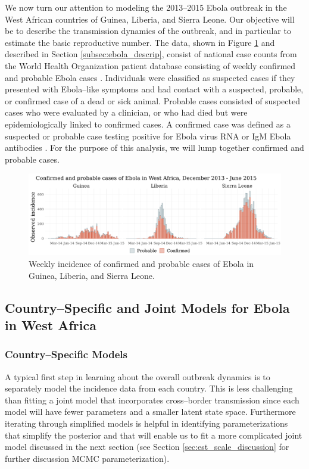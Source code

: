 We now turn our attention to modeling the 2013--2015 Ebola outbreak in the West African countries of Guinea, Liberia, and Sierra Leone. Our objective will be to describe the transmission dynamics of the outbreak, and in particular to estimate the basic reproductive number. The data, shown in Figure \ref{fig:eboladat} and described in Section \ref{subsec:ebola_descrip}, consist of national case counts from the World Health Organization patient database consisting of weekly confirmed and probable Ebola cases \cite{who2016eboladat}. Individuals were classified as suspected cases if they presented with Ebola--like symptoms and had contact with a suspected, probable, or confirmed case of a dead or sick animal. Probable cases consisted of suspected cases who were evaluated by a clinician, or who had died but were epidemiologically linked to confirmed cases. A confirmed case was defined as a suspected or probable case testing positive for Ebola virus RNA or IgM Ebola antibodies \cite{coltart2017ebola}. For the purpose of this analysis, we will lump together confirmed and probable cases.

\begin{figure}[htbp]
	\centering
	\includegraphics[width=\linewidth]{figures/ebola_dat}
	\caption{Weekly incidence of confirmed and probable cases of Ebola in Guinea, Liberia, and Sierra Leone.}
	\label{fig:eboladat}
\end{figure}

\subsection{Country--Specific and Joint Models for Ebola in West Africa}
\label{subsec:ebola_models}

\subsubsection{Country--Specific Models}
\label{subsubsec:ebola_single_models}
A typical first step in learning about the overall outbreak dynamics is to separately model the incidence data from each country. This is less challenging than fitting a joint model that incorporates cross--border transmission since each model will have fewer parameters and a smaller latent state space. Furthermore iterating through simplified models is helpful in identifying parameterizations that simplify the posterior and that will enable us to fit a more complicated joint model discussed in the next section (see Section \ref{sec:est_scale_discussion} for further discussion MCMC parameterization).

